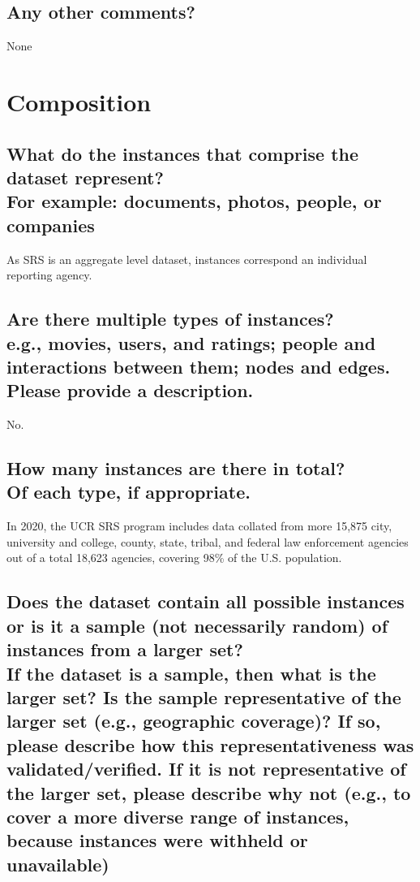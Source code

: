 \documentclass[letterpaper, 10 pt, conference]{ieeeconf}  %
\newcommand{\subtitle}[1]{{\\ \small \normalfont \color{purple} #1}}
\begin{document}
\subsection{Any other comments?}

None

\section{Composition}

\subsection{What do the instances that comprise the dataset represent? \subtitle{For example: documents, photos, people, or companies}}

As SRS is an aggregate level dataset, instances correspond an individual reporting agency.

\subsection{Are there multiple types of instances? \subtitle{e.g., movies, users, and ratings; people and interactions between them; nodes and edges. Please provide a description.}}

No.

\subsection{How many instances are there in total? \subtitle{Of each type, if appropriate.}}

In 2020, the UCR SRS program includes data collated from more 15,875 city, university and college, county, state, tribal, and federal law enforcement agencies out of a total 18,623 agencies, covering 98\% of the U.S. population.

\subsection{Does the dataset contain all possible instances or is it a sample (not necessarily random) of instances from a larger set? \subtitle{If the dataset is a sample, then what is the larger set? Is the sample representative of the larger set (e.g., geographic coverage)? If so, please describe how this representativeness was validated/verified. If it is not representative of the larger set, please describe why not (e.g., to cover a more diverse range of instances, because instances were withheld or unavailable)}}
\end{document}
